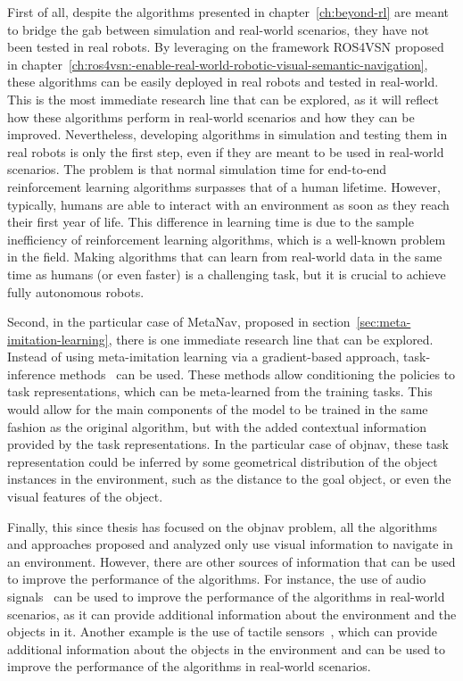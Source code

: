 First of all, despite the algorithms presented in chapter~\ref{ch:beyond-rl} are meant to bridge the gab between simulation and real-world scenarios, they have not been tested in real robots.
By leveraging on the framework ROS4VSN proposed in chapter~\ref{ch:ros4vsn:-enable-real-world-robotic-visual-semantic-navigation}, these algorithms can be easily deployed in real robots and tested in real-world.
This is the most immediate research line that can be explored, as it will reflect how these algorithms perform in real-world scenarios and how they can be improved.
Nevertheless, developing algorithms in simulation and testing them in real robots is only the first step, even if they are meant to be used in real-world scenarios.
The problem is that normal simulation time for end-to-end reinforcement learning algorithms surpasses that of a human lifetime.
However, typically, humans are able to interact with an environment as soon as they reach their first year of life.
This difference in learning time is due to the sample inefficiency of reinforcement learning algorithms, which is a well-known problem in the field.
Making algorithms that can learn from real-world data in the same time as humans (or even faster) is a challenging task, but it is crucial to achieve fully autonomous robots.

Second, in the particular case of MetaNav, proposed in section~\ref{sec:meta-imitation-learning}, there is one immediate research line that can be explored.
Instead of using meta-imitation learning via a gradient-based approach, task-inference methods~\cite{Beck_2025, rakelly2019} can be used.
These methods allow conditioning the policies to task representations, which can be meta-learned from the training tasks.
This would allow for the main components of the model to be trained in the same fashion as the original algorithm, but with the added contextual information provided by the task representations.
In the particular case of \acrshort{objnav}, these task representation could be inferred by some geometrical distribution of the object instances in the environment, such as the distance to the goal object, or even the visual features of the object.

Finally, this since thesis has focused on the \acrshort{objnav} problem, all the algorithms and approaches proposed and analyzed only use visual information to navigate in an environment.
However, there are other sources of information that can be used to improve the performance of the algorithms.
For instance, the use of audio signals~\cite{Kondoh2023MultigoalAN} can be used to improve the performance of the algorithms in real-world scenarios, as it can provide additional information about the environment and the objects in it.
Another example is the use of tactile sensors~\cite{Ota2023TactileEO}, which can provide additional information about the objects in the environment and can be used to improve the performance of the algorithms in real-world scenarios.

